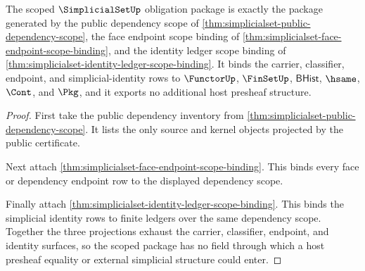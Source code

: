 \begin{theorem}
\label{thm:simplicialset-scoped-obligation-package}
The scoped $\SimplicialSetUp$ obligation package is exactly the package
generated by the public dependency scope of
\autoref{thm:simplicialset-public-dependency-scope}, the face endpoint scope
binding of \autoref{thm:simplicialset-face-endpoint-scope-binding}, and the
identity ledger scope binding of
\autoref{thm:simplicialset-identity-ledger-scope-binding}. It binds the
carrier, classifier, endpoint, and simplicial-identity rows to
$\FunctorUp$, $\FinSetUp$, $\mathsf{BHist}$, $\hsame$, $\Cont$, and $\Pkg$,
and it exports no additional host presheaf structure.
\end{theorem}
\begin{proof}
First take the public dependency inventory from
\autoref{thm:simplicialset-public-dependency-scope}. It lists the only
source and kernel objects projected by the public certificate.

Next attach
\autoref{thm:simplicialset-face-endpoint-scope-binding}. This binds every
face or dependency endpoint row to the displayed dependency scope.

Finally attach
\autoref{thm:simplicialset-identity-ledger-scope-binding}. This binds the
simplicial identity rows to finite ledgers over the same dependency scope.
Together the three projections exhaust the carrier, classifier, endpoint,
and identity surfaces, so the scoped package has no field through which a
host presheaf equality or external simplicial structure could enter.
\end{proof}

